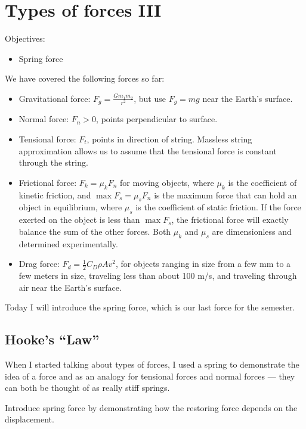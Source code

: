 \section{Types of forces III}
Objectives:
\begin{itemize}
\item Spring force
\end{itemize}

We have covered the following forces so far:
\begin{itemize}
\item Gravitational force: $F_g=\frac{Gm_1m_2}{r^2}$, but use $F_g=mg$ near the Earth's surface.
\item Normal force: $F_n>0$, points perpendicular to surface.
\item Tensional force: $F_t$, points in direction of string. Massless string approximation allows us to assume that the tensional force is constant through the string.
\item Frictional force: $F_k=\mu_kF_n$ for moving objects, where $\mu_k$ is the coefficient of kinetic friction, and $\max F_s=\mu_sF_n$ is the maximum force that can hold an object in equilibrium, where $\mu_s$ is the coefficient of static friction. If the force exerted on the object is less than $\max F_s$, the frictional force will exactly balance the sum of the other forces. Both $\mu_k$ and $\mu_s$ are dimensionless and determined experimentally.
\item Drag force: $F_d = \frac{1}{2}C_D\rho Av^2$, for objects ranging in size from a few mm to a few meters in size, traveling less than about 100 m/s, and traveling through air near the Earth's surface.
\end{itemize}

Today I will introduce the spring force, which is our last force for the semester.


\subsection{Hooke's ``Law''}
When I started talking about types of forces, I used a spring to demonstrate the idea of a force and as an analogy for tensional forces and normal forces --- they can both be thought of as really stiff springs.

Introduce spring force by demonstrating how the restoring force depends on the displacement.

